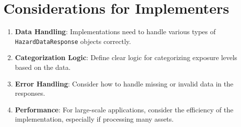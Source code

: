 \documentclass{article}
\begin{document}
\section{Considerations for Implementers}

\begin{enumerate}
    \item \textbf{Data Handling}: Implementations need to handle various types of \texttt{HazardDataResponse} objects correctly.
    \item \textbf{Categorization Logic}: Define clear logic for categorizing exposure levels based on the data.
    \item \textbf{Error Handling}: Consider how to handle missing or invalid data in the responses.
    \item \textbf{Performance}: For large-scale applications, consider the efficiency of the implementation, especially if processing many assets.
\end{enumerate}
\end{document}
